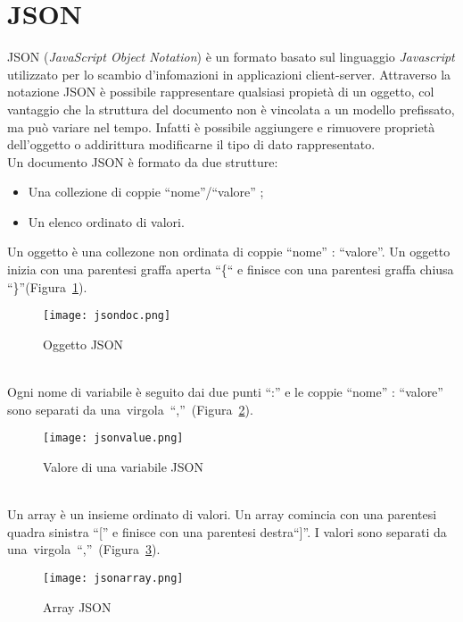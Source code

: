 \section{JSON}
JSON  (\emph{JavaScript Object Notation}) è un formato basato sul linguaggio
\emph{Javascript} utilizzato per lo scambio d'infomazioni in applicazioni
client-server. Attraverso la notazione JSON è possibile rappresentare qualsiasi
propietà di un oggetto, col vantaggio che la struttura del documento non è
vincolata a un modello prefissato, ma può variare nel tempo. Infatti è possibile
aggiungere e rimuovere proprietà dell'oggetto o addirittura modificarne il tipo
di dato rappresentato.
\\Un documento JSON è formato da due strutture:
\begin{itemize}
  \item Una collezione di coppie ``nome''/``valore'' ;
  \item Un elenco ordinato di valori. 
\end{itemize}
Un oggetto è una collezone non ordinata di coppie ``nome'' : ``valore''. Un
oggetto inizia con una parentesi graffa aperta ``\{`` e finisce con una parentesi
graffa chiusa ``\}''(Figura~\ref{fig:jsondoc}).
\begin{figure}[!h]
  \begin{center}
      \texttt{[image: jsondoc.png]}
      \caption{Oggetto JSON}
      \label{fig:jsondoc}
  \end{center}
\end{figure}
\\Ogni nome di variabile è seguito dai due punti ``:'' e le coppie
``nome'' : ``valore'' sono separati
da una~virgola~``,''~(Figura~\ref{fig:jsonvalue}).
\begin{figure}[!h]
  \begin{center}
      \texttt{[image: jsonvalue.png]}
      \caption{Valore di una variabile JSON}
      \label{fig:jsonvalue}
  \end{center}
\end{figure}
\\Un array è un insieme ordinato di valori. Un array comincia con una parentesi
quadra sinistra ``{[}'' e finisce con una parentesi destra``{]}''. I valori
sono separati da una~virgola~``,''~(Figura~\ref{fig:jsonarray}).
\begin{figure}[!h]
\begin{center}
    \texttt{[image: jsonarray.png]}
    \caption{Array JSON}
    \label{fig:jsonarray}
\end{center}
\end{figure}
